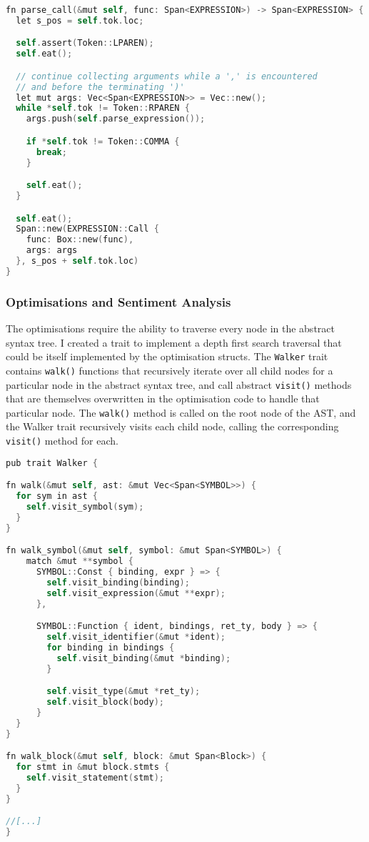 \begin{lstlisting}[language=C]
fn parse_call(&mut self, func: Span<EXPRESSION>) -> Span<EXPRESSION> {
  let s_pos = self.tok.loc;

  self.assert(Token::LPAREN);
  self.eat();

  // continue collecting arguments while a ',' is encountered 
  // and before the terminating ')' 
  let mut args: Vec<Span<EXPRESSION>> = Vec::new();
  while *self.tok != Token::RPAREN {
    args.push(self.parse_expression());

    if *self.tok != Token::COMMA {
      break;
    }

    self.eat();
  }

  self.eat();
  Span::new(EXPRESSION::Call { 
    func: Box::new(func), 
    args: args 
  }, s_pos + self.tok.loc)
}
\end{lstlisting}

\subsubsection{Optimisations and Sentiment Analysis}
The optimisations require the ability to traverse every node in the abstract syntax tree. I created a trait to implement a depth first search traversal that could be itself implemented by the optimisation structs. The \texttt{Walker} trait contains \texttt{walk()} functions that recursively iterate over all child nodes for a particular node in the abstract syntax tree, and call abstract \texttt{visit()} methods that are themselves overwritten in the optimisation code to handle that particular node. The \texttt{walk()} method is called on the root node of the AST, and the Walker trait recursively visits each child node, calling the corresponding \texttt{visit()} method for each. 

\label{Walker}
\begin{lstlisting}[language=C]
pub trait Walker {

fn walk(&mut self, ast: &mut Vec<Span<SYMBOL>>) {
  for sym in ast {
    self.visit_symbol(sym);
  }
}

fn walk_symbol(&mut self, symbol: &mut Span<SYMBOL>) {
    match &mut **symbol {
      SYMBOL::Const { binding, expr } => {
        self.visit_binding(binding);
        self.visit_expression(&mut **expr);
      }, 

      SYMBOL::Function { ident, bindings, ret_ty, body } => {
        self.visit_identifier(&mut *ident);
        for binding in bindings {
          self.visit_binding(&mut *binding);
        }

        self.visit_type(&mut *ret_ty);
        self.visit_block(body);
      }
  } 
}

fn walk_block(&mut self, block: &mut Span<Block>) {
  for stmt in &mut block.stmts {
    self.visit_statement(stmt);
  }
}

//[...]
}
\end{lstlisting}

